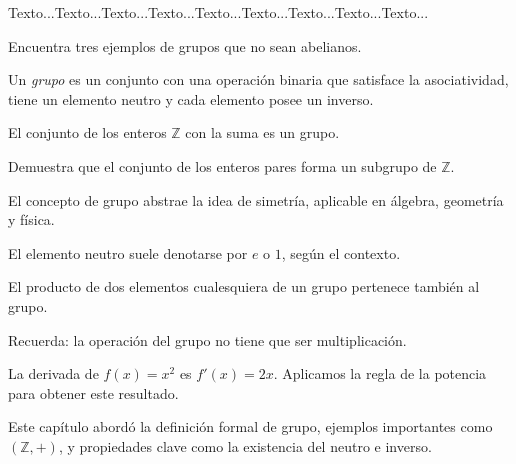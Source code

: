 Texto...Texto...Texto...Texto...Texto...Texto...Texto...Texto...Texto...


 \begin{activity}
  Encuentra tres ejemplos de grupos que no sean abelianos.
\end{activity}

\begin{definition}
  Un \emph{grupo} es un conjunto con una operación binaria que satisface la asociatividad, tiene un elemento neutro y cada elemento posee un inverso.
\end{definition}

\begin{example}
  El conjunto de los enteros \( \mathbb{Z} \) con la suma es un grupo.
\end{example}

\begin{exercise}
  Demuestra que el conjunto de los enteros pares forma un subgrupo de \( \mathbb{Z} \).
\end{exercise}

\begin{generality}
  El concepto de grupo abstrae la idea de simetría, aplicable en álgebra, geometría y física.
\end{generality}

\begin{note}
  El elemento neutro suele denotarse por \( e \) o \( 1 \), según el contexto.
\end{note}

\begin{property}[Clausura]
  El producto de dos elementos cualesquiera de un grupo pertenece también al grupo.
\end{property}

\begin{remark}
  Recuerda: la operación del grupo no tiene que ser multiplicación.
\end{remark}

\begin{solution}
  La derivada de \( f(x) = x^2 \) es \( f'(x) = 2x \).
  Aplicamos la regla de la potencia para obtener este resultado.
\end{solution}

\begin{summary}
  Este capítulo abordó la definición formal de grupo, ejemplos importantes como \((\mathbb{Z}, +)\), y propiedades clave como la existencia del neutro e inverso.
\end{summary}

